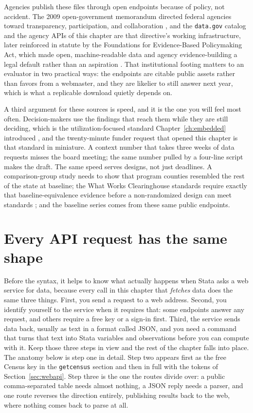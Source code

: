 Agencies publish these files through open endpoints because of policy, not accident. The 2009 open-government memorandum directed federal agencies toward transparency, participation, and collaboration \parencite{obama2009transparency}, and the \texttt{data.gov} catalog and the agency APIs of this chapter are that directive's working infrastructure, later reinforced in statute by the Foundations for Evidence-Based Policymaking Act, which made open, machine-readable data and agency evidence-building a legal default rather than an aspiration \parencite{congress2019evidence}. That institutional footing matters to an evaluator in two practical ways: the endpoints are citable public assets rather than favors from a webmaster, and they are likelier to still answer next year, which is what a replicable download quietly depends on.

A third argument for these sources is speed, and it is the one you will feel most often. Decision-makers use the findings that reach them while they are still deciding, which is the utilization-focused standard Chapter~\ref{ch:embedded} introduced \parencite{patton2008utilization}, and the twenty-minute funder request that opened this chapter is that standard in miniature. A context number that takes three weeks of data requests misses the board meeting; the same number pulled by a four-line script makes the draft. The same speed serves designs, not just deadlines. A comparison-group study needs to show that program counties resembled the rest of the state at baseline; the What Works Clearinghouse standards require exactly that baseline-equivalence evidence before a non-randomized design can meet standards \parencite{wwc2022handbook}; and the baseline series comes from these same public endpoints.

\section{Every API request has the same shape}\label{ch03-sc-shape}
Before the syntax, it helps to know what actually happens when Stata asks a web service for data, because every call in this chapter that \emph{fetches} data does the same three things. First, you send a request to a web address. Second, you identify yourself to the service when it requires that: some endpoints answer any request, and others require a free key or a sign-in first. Third, the service sends data back, usually as text in a format called JSON, and you need a command that turns that text into Stata variables and observations before you can compute with it. Keep those three steps in view and the rest of the chapter falls into place. The anatomy below is step one in detail. Step two appears first as the free Census key in the \texttt{getcensus} section and then in full with the tokens of Section~\ref{sec:webapi}. Step three is the one the routes divide over: a public comma-separated table needs almost nothing, a JSON reply needs a parser, and one route reverses the direction entirely, publishing results back to the web, where nothing comes back to parse at all.


